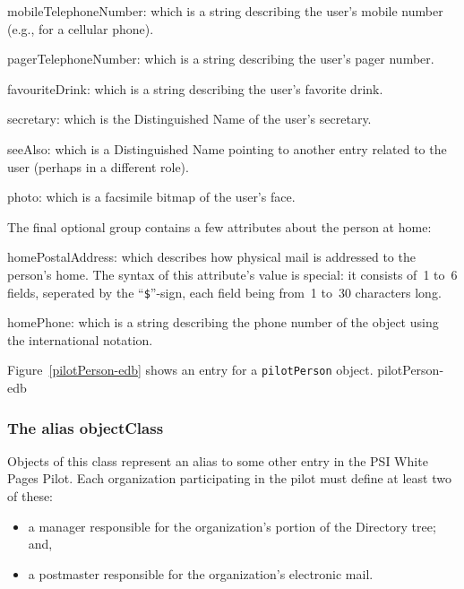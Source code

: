 \begin{describe}
\item[mobileTelephoneNumber:]
			which is a string describing the user's mobile
			number (e.g., for a cellular phone).

\item[pagerTelephoneNumber:]
			which is a string describing the user's pager number.

\item[favouriteDrink:]
			which is a string describing the user's favorite drink.

\item[secretary:]
			which is the Distinguished Name of the user's
			secretary.

\item[seeAlso:]
			which is a Distinguished Name pointing to another
			entry related to the user (perhaps in a different
			role).

\item[photo:]
			which is a facsimile bitmap of the user's face.
\end{describe}
The final optional group contains a few attributes about the person at home:
\begin{describe}
\item[homePostalAddress:]
			which describes how physical mail is addressed to the
			person's home.
			The syntax of this attribute's value is special:
			it consists of~1 to~6 fields, seperated by the
			``\verb"$"''-sign, each field being from~1 to~30
			characters long.

\item[homePhone:]
		which is a string describing the phone number of the object
		using the international notation.
\end{describe}
Figure~\ref{pilotPerson-edb} shows an entry for a \verb"pilotPerson" object.
%
	{pilotPerson-edb}

\subsubsection	{The alias objectClass}
Objects of this class represent an alias to some other entry in the
PSI White Pages Pilot.
Each organization participating in the pilot must define at least two of
these:
\begin{itemize}
\item	a manager responsible for the organization's portion of the Directory
	tree;
	and,

\item	a postmaster responsible for the organization's electronic mail.
\end{itemize}

